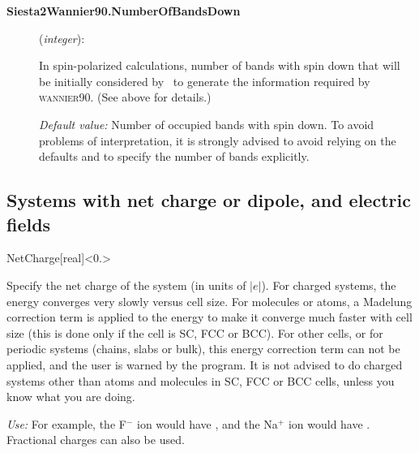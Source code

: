 \begin{description}
\item[\textbf{Siesta2Wannier90.NumberOfBandsDown}] (\textit{integer}):

In spin-polarized calculations, number of bands with spin down that will be
initially considered by \siesta\ to generate the information
required by \textsc{wannier90}. (See above for details.)


\textit{Default value:} {Number of occupied bands with spin down. To
  avoid problems of interpretation, it is strongly advised to avoid
  relying on the defaults and to specify the number of bands
  explicitly. }

\end{description}

\vspace{5pt}
\subsection{Systems with net charge or dipole, and electric fields}

\begin{fdfentry}{NetCharge}[real]<$0.$>%

  Specify the net charge of the system (in units of $|e|$).  For
  charged systems, the energy converges very slowly versus cell
  size. For molecules or atoms, a Madelung correction term is applied
  to the energy to make it converge much faster with cell size (this
  is done only if the cell is SC, FCC or BCC). For other cells, or for
  periodic systems (chains, slabs or bulk), this energy correction
  term can not be applied, and the user is warned by the program. It
  is not advised to do charged systems other than atoms and molecules
  in SC, FCC or BCC cells, unless you know what you are doing.

  \textit{Use:} For example, the F$^-$ ion would have 
   , and the Na$^+$ ion would have  .
  Fractional charges can also be used.
  
\end{fdfentry}


